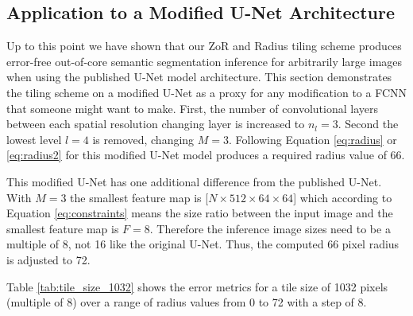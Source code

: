 \documentclass[letterpaper]{article} %
\begin{document}
\subsection{Application to a Modified U-Net Architecture}

Up to this point we have shown that our ZoR and Radius tiling scheme produces error-free out-of-core semantic segmentation inference for arbitrarily large images when using the published U-Net model architecture. 
This section demonstrates the tiling scheme on a modified U-Net as a proxy for any modification to a FCNN that someone might want to make. 
First, the number of convolutional layers between each spatial resolution changing layer is increased to $n_l = 3$. Second the lowest level $l = 4$ is removed, changing $M = 3$. 
Following Equation \ref{eq:radius} or \ref{eq:radius2} for this modified U-Net model produces a required radius value of 66. 


This modified U-Net has one additional difference from the published U-Net. With $M = 3$ the smallest feature map is [$N \times 512 \times 64 \times 64$] which according to Equation \ref{eq:constraints} means the size ratio between the input image and the smallest feature map is $F = 8$. Therefore the inference image sizes need to be a multiple of 8, not 16 like the original U-Net. Thus, the computed 66 pixel radius is adjusted to 72. 

Table \ref{tab:tile_size_1032} shows the error metrics for a tile size of 1032 pixels (multiple of 8) over a range of radius values from 0 to 72 with a step of 8. 
\end{document}

